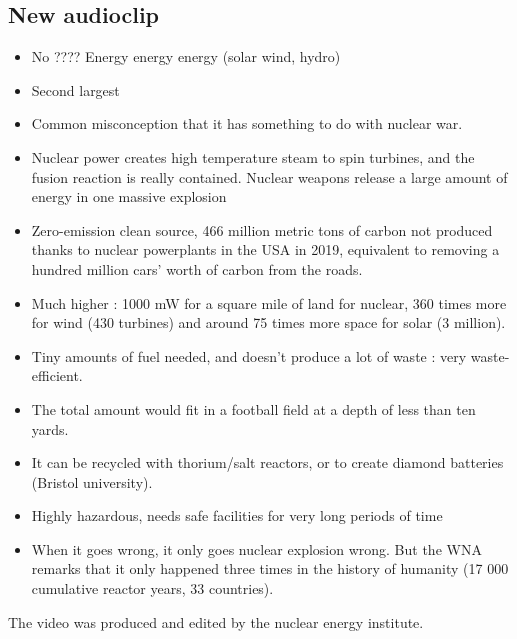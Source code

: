 \documentclass[a4paper,12pt]{book}
\begin{document}
\subsection{New audioclip}
\begin{itemize}
\item No ???? Energy energy energy (solar wind, hydro)
\item Second largest
\item Common misconception that it has something to do with nuclear war.
\item Nuclear power creates high temperature steam to spin turbines, and the fusion reaction is really contained. Nuclear weapons release a large amount of energy in one massive explosion
\item Zero-emission clean source, 466 million metric tons of carbon not produced thanks to nuclear powerplants in the USA in 2019, equivalent to removing a hundred million cars' worth of carbon from the roads.
\item Much higher : 1000 mW for a square mile of land for nuclear, 360 times more for wind (430 turbines) and around 75 times more space for solar (3 million).
\item Tiny amounts of fuel needed, and doesn't produce a lot of waste : very waste-efficient.
\item The total amount would fit in a football field at a depth of less than ten yards.
\item It can be recycled with thorium/salt reactors, or to create diamond batteries (Bristol university).
\item Highly hazardous, needs safe facilities for very long periods of time
\item When it goes wrong, it only goes nuclear explosion wrong. But the WNA remarks that it only happened three times in the history of humanity (17 000 cumulative reactor years, 33 countries).
\end{itemize}
The video was produced and edited by the nuclear energy institute.
\end{document}
